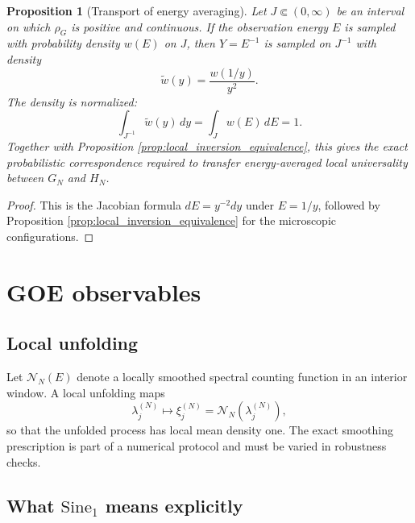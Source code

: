 \documentclass[11pt]{amsart}
\numberwithin{equation}{section}
\theoremstyle{plain}
\newtheorem{proposition}[theorem]{Proposition}
\theoremstyle{definition}
\theoremstyle{remark}
\begin{document}
\begin{proposition}[Transport of energy averaging]
\label{prop:energy_weight_transport}
Let $J\Subset(0,\infty)$ be an interval on which $\rho_G$ is positive and continuous.  If the observation energy $E$ is sampled with probability density $w(E)$ on $J$, then $Y=E^{-1}$ is sampled on $J^{-1}$ with density
\begin{equation}
\widetilde w(y)=\frac{w(1/y)}{y^2}.
\label{eq:inverse_energy_weight}
\end{equation}
The density is normalized:
\begin{equation}
\int_{J^{-1}}\widetilde w(y)\,dy=\int_J w(E)\,dE=1.
\end{equation}
Together with Proposition \ref{prop:local_inversion_equivalence}, this gives the exact probabilistic correspondence required to transfer energy-averaged local universality between $G_N$ and $H_N$.
\end{proposition}

\begin{proof}
This is the Jacobian formula $dE=y^{-2}dy$ under $E=1/y$, followed by Proposition \ref{prop:local_inversion_equivalence} for the microscopic configurations.
\end{proof}

\section{GOE observables}
\label{sec:goe_observables}

\subsection{Local unfolding}
\label{subsec:unfolding}

Let $\mathcal N_N(E)$ denote a locally smoothed spectral counting function in an interior window.  A local unfolding maps
\begin{equation}
\lambda_j^{(N)}\longmapsto
\xi_j^{(N)}=\mathcal N_N\!\left(\lambda_j^{(N)}\right),
\label{eq:local_unfolding}
\end{equation}
so that the unfolded process has local mean density one.  The exact smoothing prescription is part of a numerical protocol and must be varied in robustness checks.


\subsection{What $\mathrm{Sine}_1$ means explicitly}
\label{subsec:sine1_explicit}
\end{document}
